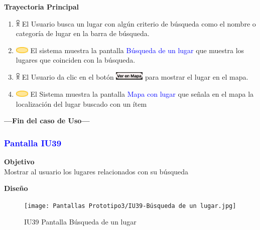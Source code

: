 \textbf{Trayectoria Principal}
\begin{enumerate}
    \item \includegraphics[width=0.0150\textwidth]{Figuras/persona.png} El Usuario busca un lugar con algún criterio de búsqueda como el nombre o categoría de lugar en la barra de búsqueda.
    \item \includegraphics[width=0.0500\textwidth]{Figuras/sistema.png} El sistema muestra la pantalla \textcolor{blue}{Búsqueda de un lugar} que muestra los lugares que coinciden con la búsqueda.
    \item \includegraphics[width=0.0150\textwidth]{Figuras/persona.png} El Usuario da clic en el botón \includegraphics[width=0.110\textwidth]{ComponentesCU/Ver en Mapa.png} para mostrar el lugar en el mapa.
    \item \includegraphics[width=0.0500\textwidth]{Figuras/sistema.png} El Sistema muestra la pantalla \textcolor{blue}{Mapa con lugar} que señala en el mapa la localización del lugar buscado con un ítem
\end{enumerate}
\textbf{---Fin del caso de Uso---}

\subsubsection{\textcolor{blue}{Pantalla IU39}}

\textbf{Objetivo} \\
Mostrar al usuario los lugares relacionados con su búsqueda
\vspace{15pt}

\textbf{Diseño}

    \begin{figure}[h]
        
            \centering
            \texttt{[image: Pantallas Prototipo3/IU39-Búsqueda de un lugar.jpg]}
        \caption{IU39 Pantalla Búsqueda de un lugar}
    
    \end{figure}

